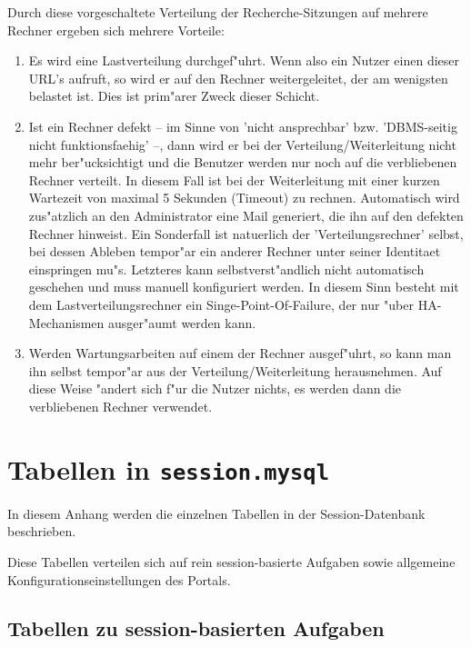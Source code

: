 \documentclass[11pt, twoside, a4paper, BCOR8mm, DIV12, bibtotoc,idxtotoc]{scrbook}
\begin{document}
Durch diese vorgeschaltete Verteilung der Recherche-Sitzungen auf
mehrere Rechner ergeben sich mehrere Vorteile:

\begin{enumerate}
\item Es wird eine Lastverteilung durchgef"uhrt. Wenn also ein Nutzer
  einen dieser URL's aufruft, so wird er auf den Rechner
  weitergeleitet, der am wenigsten belastet ist.  Dies ist prim"arer
  Zweck dieser Schicht.
\item Ist ein Rechner defekt -- im Sinne von 'nicht ansprechbar'
  bzw. 'DBMS-seitig nicht funktionsfaehig' --, dann wird er bei der
  Verteilung/Weiterleitung nicht mehr ber"ucksichtigt und die Benutzer
  werden nur noch auf die verbliebenen Rechner verteilt. In diesem
  Fall ist bei der Weiterleitung mit einer kurzen Wartezeit von
  maximal 5 Sekunden (Timeout) zu rechnen.  Automatisch wird
  zus"atzlich an den Administrator eine Mail ge\-ne\-riert, die ihn
  auf den defekten Rechner hinweist. Ein Sonderfall ist natuerlich der
  'Verteilungs\-rech\-ner' selbst, bei dessen Ableben tempor"ar ein
  anderer Rechner unter seiner Identitaet einspringen mu"s. Letzteres
  kann selbstverst"andlich nicht automatisch geschehen und muss
  manuell konfiguriert werden. In diesem Sinn besteht mit dem
  Lastverteilungsrechner ein Singe-Point-Of-Failure, der nur "uber
  HA-Mechanismen ausger"aumt werden kann.
\item Werden Wartungsarbeiten auf einem der Rechner ausgef"uhrt, so
  kann man ihn selbst tempor"ar aus der Verteilung/Weiterleitung
  herausnehmen. Auf diese Weise "andert sich f"ur die Nutzer nichts,
  es werden dann die verbliebenen Rechner verwendet.
\end{enumerate}

\appendix

\chapter{Tabellen in \texttt{session.mysql}}

In diesem Anhang werden die einzelnen Tabellen in der
Session-Datenbank beschrieben.

Diese Tabellen verteilen sich auf rein session-basierte Aufgaben sowie
allgemeine Konfigurationseinstellungen des Portals.


\section{Tabellen zu session-basierten Aufgaben}
\end{document}
